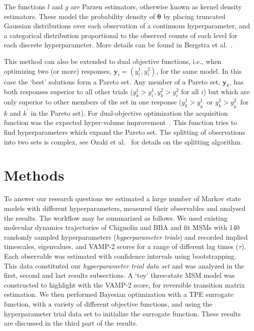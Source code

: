 \documentclass[journal=jacsat,manuscript=article]{achemso}
\begin{document}
The functions $l$ and $g$ are Parzen estimators, otherwise known as kernel density estimators. These model the probability density of $\bm{\theta}$ by placing truncated Gaussian distributions over each observation of a continuous hyperparameter, and a categorical distribution proportional to the observed counts of each level for each discrete hyperparameter. More details can be found in Bergstra et al.~\cite{bergstraAlgorithmsHyperParameterOptimizationa, bergstraMakingScienceModel2013}. 

This method can also be extended to dual objective functions, i.e., when optimizing two (or more) responses, $\mathbf{y}_i=(y^1_i, y^2_i)$, for the same model. In this case the `best' solutions form a Pareto set. Any member of a Pareto set, $\mathbf{y}_k$, has both responses superior to all other trials ($y^1_k>y^1_i, y^2_k>y^2_i$ for all $i$) but which are only superior to other members of the set in one response ($y^1_k>y^1_{k^{\prime}}$ or $y^2_k>y^2_{k^{\prime}}$ for $k$ and $k^{\prime}$ in the Pareto set). For dual-objective optimization the acquisition function was the expected hyper-volume improvement~\cite{ozaki_multitpe_2022}. This function tries to find hyperparameters which expand the Pareto set. The splitting of observations into two sets is complex, see Ozaki et al.~\cite{ozaki_multitpe_2022} for details on the splitting algorithm.



\section{Methods}
To answer our research questions we estimated a large number of Markov state models with different hyperparameters, measured their observables and analysed the results. The workflow may be summarized as follows.  We used existing molecular dynamics trajectories of Chignolin and BBA and fit MSMs with 140 randomly sampled hyperparameters (\emph{hyperparameter trials}) and recorded implied timescales, eigenvalues, and VAMP-2 scores for a range of different lag times ($\tau$). Each observable was estimated with confidence intervals using bootstrapping. This data constituted our \emph{hyperparameter trial data set} and was analyzed in the first, second and last results subsections. A `toy' three-state MSM model was constructed to highlight with the VAMP-2 score, for reversible transition matrix estimation. We then performed Bayesian optimization with a TPE surrogate function, with a variety of different objective functions, and using the hyperparameter trial data set to initialize the surrogate function. These results are discussed in the third part of the results.
\end{document}
